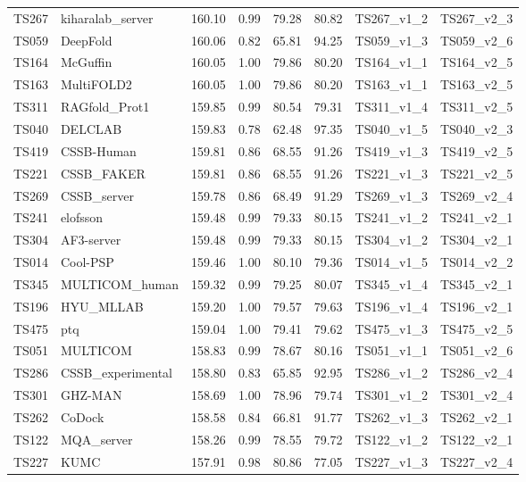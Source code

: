 \begin{longtable}{llllllll}
TS267 & kiharalab\_server & 160.10 & 0.99 & 79.28 & 80.82 & TS267\_v1\_2 & TS267\_v2\_3 \\ 
TS059 & DeepFold & 160.06 & 0.82 & 65.81 & 94.25 & TS059\_v1\_3 & TS059\_v2\_6 \\ 
TS164 & McGuffin & 160.05 & 1.00 & 79.86 & 80.20 & TS164\_v1\_1 & TS164\_v2\_5 \\ 
TS163 & MultiFOLD2 & 160.05 & 1.00 & 79.86 & 80.20 & TS163\_v1\_1 & TS163\_v2\_5 \\ 
TS311 & RAGfold\_Prot1 & 159.85 & 0.99 & 80.54 & 79.31 & TS311\_v1\_4 & TS311\_v2\_5 \\ 
TS040 & DELCLAB & 159.83 & 0.78 & 62.48 & 97.35 & TS040\_v1\_5 & TS040\_v2\_3 \\ 
TS419 & CSSB-Human & 159.81 & 0.86 & 68.55 & 91.26 & TS419\_v1\_3 & TS419\_v2\_5 \\ 
TS221 & CSSB\_FAKER & 159.81 & 0.86 & 68.55 & 91.26 & TS221\_v1\_3 & TS221\_v2\_5 \\ 
TS269 & CSSB\_server & 159.78 & 0.86 & 68.49 & 91.29 & TS269\_v1\_3 & TS269\_v2\_4 \\ 
TS241 & elofsson & 159.48 & 0.99 & 79.33 & 80.15 & TS241\_v1\_2 & TS241\_v2\_1 \\ 
TS304 & AF3-server & 159.48 & 0.99 & 79.33 & 80.15 & TS304\_v1\_2 & TS304\_v2\_1 \\ 
TS014 & Cool-PSP & 159.46 & 1.00 & 80.10 & 79.36 & TS014\_v1\_5 & TS014\_v2\_2 \\ 
TS345 & MULTICOM\_human & 159.32 & 0.99 & 79.25 & 80.07 & TS345\_v1\_4 & TS345\_v2\_1 \\ 
TS196 & HYU\_MLLAB & 159.20 & 1.00 & 79.57 & 79.63 & TS196\_v1\_4 & TS196\_v2\_1 \\ 
TS475 & ptq & 159.04 & 1.00 & 79.41 & 79.62 & TS475\_v1\_3 & TS475\_v2\_5 \\ 
TS051 & MULTICOM & 158.83 & 0.99 & 78.67 & 80.16 & TS051\_v1\_1 & TS051\_v2\_6 \\ 
TS286 & CSSB\_experimental & 158.80 & 0.83 & 65.85 & 92.95 & TS286\_v1\_2 & TS286\_v2\_4 \\ 
TS301 & GHZ-MAN & 158.69 & 1.00 & 78.96 & 79.74 & TS301\_v1\_2 & TS301\_v2\_4 \\ 
TS262 & CoDock & 158.58 & 0.84 & 66.81 & 91.77 & TS262\_v1\_3 & TS262\_v2\_1 \\ 
TS122 & MQA\_server & 158.26 & 0.99 & 78.55 & 79.72 & TS122\_v1\_2 & TS122\_v2\_1 \\ 
TS227 & KUMC & 157.91 & 0.98 & 80.86 & 77.05 & TS227\_v1\_3 & TS227\_v2\_4 \\ 

\end{longtable}
